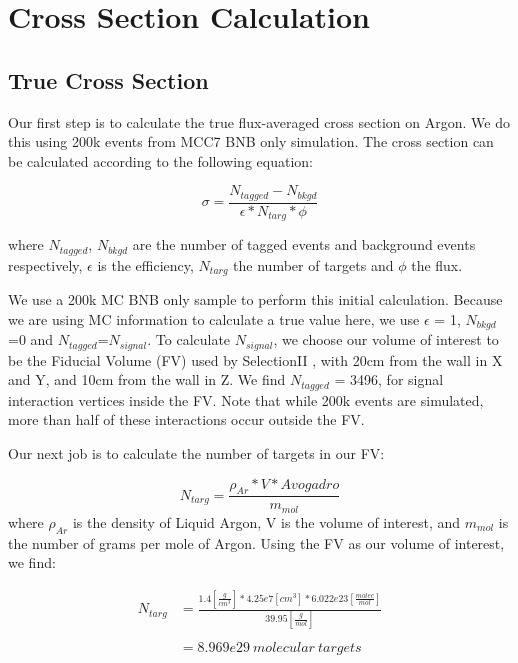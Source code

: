 \documentclass[12pt]{article}
\begin{document}
\newpage
\section {Cross Section Calculation}
\subsection{True Cross Section}
Our first step is to calculate the true flux-averaged cross section on Argon. We do this using 200k events from MCC7 BNB only simulation.  The cross section can be calculated according to the following equation:

\begin{equation}
  \sigma = \frac{N_{tagged} - N_{bkgd}}{\epsilon*N_{targ}*\phi}
\end{equation}

\noindent where $N_{tagged}$, $N_{bkgd}$ are the number of tagged events and background events respectively, $\epsilon$ is the efficiency, $N_{targ}$ the number of targets and $\phi$ the flux. 
\par We use a 200k MC BNB only sample to perform this initial calculation.  Because we are using MC information to calculate a true value here, we use $\epsilon$ = 1, $N_{bkgd}$=0 and $N_{tagged}$=$N_{signal}$.  To calculate $N_{signal}$, we choose our volume of interest to be the Fiducial Volume (FV) used by SelectionII \cite{bib:numucc}, with 20cm from the wall in X and Y, and 10cm from the wall in Z. We find $N_{tagged}$ = 3496, for signal interaction vertices inside the FV. Note that while 200k events are simulated, more than half of these interactions occur outside the FV. 
\par Our next job is to calculate the number of targets in our FV:

\begin{equation} \label{eq:1}
  N_{targ} = \frac{\rho_{Ar} * V * Avogadro}{m_{mol}} 
\end{equation}
\noindent where $\rho_{Ar}$ is the density of Liquid Argon, V is the volume of interest, and $m_{mol}$ is the number of grams per mole of Argon.  Using the FV as our volume of interest, we find: 

\begin{align}
N_{targ} &= \frac{1.4 [\frac{g}{cm^3}] * 4.25e7 [cm^3] * 6.022e23 [\frac{molec}{mol}]}{39.95 [\frac{g}{mol}]} \\\\
&= 8.969e29\ molecular\ targets
\end{align}
\end{document}
